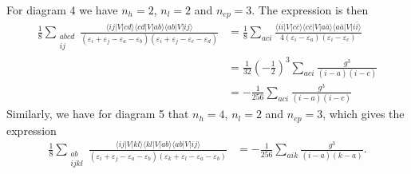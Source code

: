 For diagram 4 we have $n_h = 2$, $n_l = 2$ and $n_{ep} = 3$.
The expression is then
\begin{align*}
    \frac{1}{8} \sum_{\substack{abcd \\ ij}} \frac{
        \langle ij \vert V \vert cd \rangle
        \langle cd \vert V \vert ab \rangle
        \langle ab \vert V \vert ij \rangle
    }{
        (
            \varepsilon_i + \varepsilon_j - \varepsilon_a - \varepsilon_b
        )(
            \varepsilon_i + \varepsilon_j - \varepsilon_c - \varepsilon_d
        )
    }
    &= \frac{1}{8} \sum_{aci} \frac{
        \langle i\bar{i} \vert V \vert c\bar{c} \rangle %
        \langle c\bar{c} \vert V \vert a\bar{a} \rangle
        \langle a\bar{a} \vert V \vert i\bar{i} \rangle %
    }{
        4(
            \varepsilon_i - \varepsilon_a
        )(
            \varepsilon_i - \varepsilon_c
        )
    } \\
    &= \frac{1}{32} \left( -\frac{1}{2} \right)^3 \sum_{aci} \frac{
        g^3
    }{(i - a)(i - c)} \\
    &= -\frac{1}{256} \sum_{aci} \frac{g^3}{(i-a)(i-c)}
\end{align*}
Similarly, we have for diagram 5 that $n_h = 4$, $n_l = 2$ and $n_{ep} = 3$, which gives the expression
\begin{align*}
    \frac{1}{8} \sum_{\substack{ab \\ ijkl}} \frac{
        \langle ij \vert V \vert kl \rangle
        \langle kl \vert V \vert ab \rangle
        \langle ab \vert V \vert ij \rangle
    }{
        (
            \varepsilon_i + \varepsilon_j - \varepsilon_a - \varepsilon_b
        )(
            \varepsilon_k + \varepsilon_l - \varepsilon_a - \varepsilon_b
        )
    } &= -\frac{1}{256} \sum_{aik} \frac{g^3}{(i-a)(k-a)}.
\end{align*}

